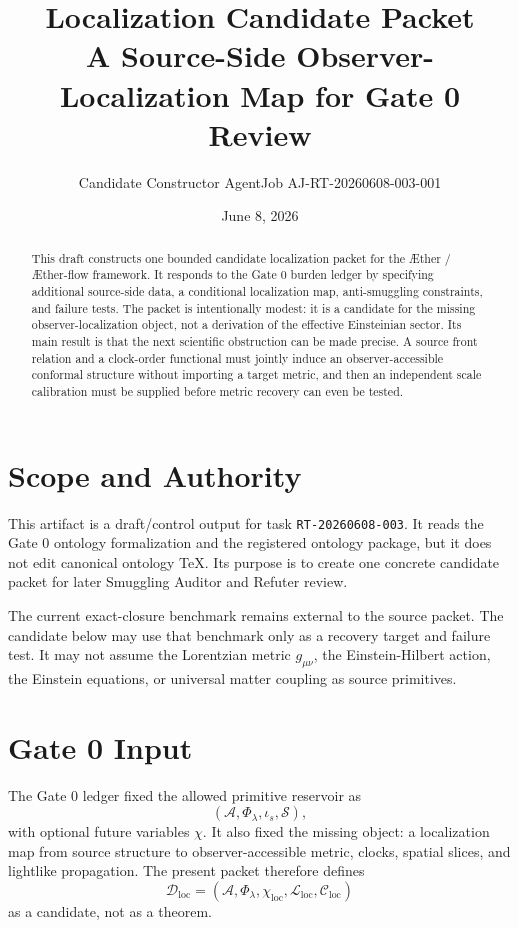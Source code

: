 \documentclass[11pt]{article}
\title{\textbf{Localization Candidate Packet}\\[0.35em]
\large A Source-Side Observer-Localization Map for Gate 0 Review}
\author{Candidate Constructor AgentJob AJ-RT-20260608-003-001}
\date{June 8, 2026}
\newcommand{\Aether}{\AE{}ther}
\newcommand{\Aflow}{\AE{}ther-flow}
\newcommand{\TheoryProgram}{\Aether{} / \Aflow{} framework}
\newcommand{\Sub}{\mathcal{A}}
\newcommand{\PhiFlow}{\Phi_{\lambda}}
\newcommand{\Data}{\mathcal{D}_{\mathrm{loc}}}
\newcommand{\Map}{\mathcal{L}_{\mathrm{loc}}}
\newcommand{\Constraints}{\mathcal{C}_{\mathrm{loc}}}
\newcommand{\Order}{\mathcal{S}}
\begin{document}
\maketitle

\begin{abstract}
This draft constructs one bounded candidate localization packet for the
\TheoryProgram{}. It responds to the Gate 0 burden ledger by specifying
additional source-side data, a conditional localization map, anti-smuggling
constraints, and failure tests. The packet is intentionally modest: it is a
candidate for the missing observer-localization object, not a derivation of the
effective Einsteinian sector. Its main result is that the next scientific
obstruction can be made precise. A source front relation and a clock-order
functional must jointly induce an observer-accessible conformal structure
without importing a target metric, and then an independent scale calibration
must be supplied before metric recovery can even be tested.
\end{abstract}

\section{Scope and Authority}

This artifact is a draft/control output for task \texttt{RT-20260608-003}. It
reads the Gate 0 ontology formalization and the registered ontology package, but
it does not edit canonical ontology TeX. Its purpose is to create one concrete
candidate packet for later Smuggling Auditor and Refuter review.

The current exact-closure benchmark remains external to the source packet. The
candidate below may use that benchmark only as a recovery target and failure
test. It may not assume the Lorentzian metric \(g_{\mu\nu}\), the
Einstein-Hilbert action, the Einstein equations, or universal matter coupling as
source primitives.

\section{Gate 0 Input}

The Gate 0 ledger fixed the allowed primitive reservoir as
\[
(\Sub,\PhiFlow,\iota_s,\Order),
\]
with optional future variables \(\chi\). It also fixed the missing object: a
localization map from source structure to observer-accessible metric, clocks,
spatial slices, and lightlike propagation. The present packet therefore defines
\[
\Data=(\Sub,\PhiFlow,\chi_{\mathrm{loc}},\Map,\Constraints)
\]
as a candidate, not as a theorem.
\end{document}
